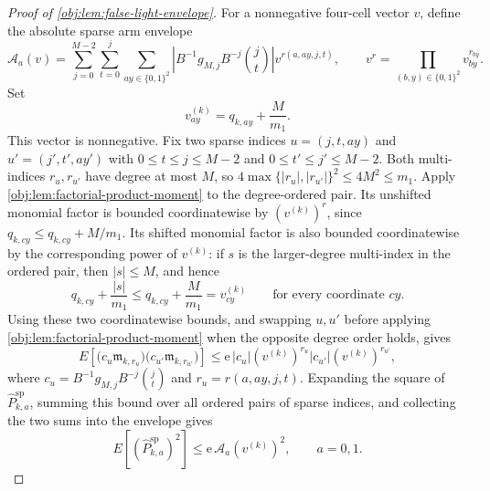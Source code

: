 \begin{proof}[Proof of \cref{obj:lem:false-light-envelope}]
For a nonnegative four-cell vector \(v\), define the absolute sparse arm envelope
\[
\mathcal A_a(v)
=
\sum_{j=0}^{M-2}\sum_{t=0}^j\sum_{ay\in\{0,1\}^2}
\left|B^{-1}g_{M,j}B^{-j}\binom jt\right|
 v^{r(a,ay,j,t)},
\qquad
v^r=\prod_{(b,y)\in\{0,1\}^2}v_{by}^{r_{by}}.
\]
Set
\[
v^{(k)}_{ay}=q_{k,ay}+\frac{M}{m_1}.
\]
This vector is nonnegative.  Fix two sparse indices \(u=(j,t,ay)\) and \(u'=(j',t',ay')\) with \(0\le t\le j\le M-2\) and \(0\le t'\le j'\le M-2\).  Both multi-indices \(r_u,r_{u'}\) have degree at most \(M\), so \(4\max\{|r_u|,|r_{u'}|\}^2\le4M^2\le m_1\).  Apply \cref{obj:lem:factorial-product-moment} to the degree-ordered pair.  Its unshifted monomial factor is bounded coordinatewise by \((v^{(k)})^{r}\), since \(q_{k,cy}\le q_{k,cy}+M/m_1\).  Its shifted monomial factor is also bounded coordinatewise by the corresponding power of \(v^{(k)}\): if \(s\) is the larger-degree multi-index in the ordered pair, then \(|s|\le M\), and hence
\[
q_{k,cy}+\frac{|s|}{m_1}
\le
q_{k,cy}+\frac{M}{m_1}
=v^{(k)}_{cy}
\qquad\text{for every coordinate }cy.
\]
Using these two coordinatewise bounds, and swapping \(u,u'\) before applying \cref{obj:lem:factorial-product-moment} when the opposite degree order holds, gives
\[
E\!\left[
\bigl(c_u\mathfrak m_{k,r_u}\bigr)
\bigl(c_{u'}\mathfrak m_{k,r_{u'}}\bigr)
\right]
\le
\mathrm e\,
\left|c_u\right|(v^{(k)})^{r_u}
\left|c_{u'}\right|(v^{(k)})^{r_{u'}},
\]
where \(c_u=B^{-1}g_{M,j}B^{-j}\binom jt\) and \(r_u=r(a,ay,j,t)\).  Expanding the square of \(\widehat P_{k,a}^{\mathrm{sp}}\), summing this bound over all ordered pairs of sparse indices, and collecting the two sums into the envelope gives
\[
E\!\left[(\widehat P_{k,a}^{\mathrm{sp}})^2\right]
\le
\mathrm e\,\mathcal A_a(v^{(k)})^2,
\qquad a=0,1.
\]


\end{proof}

